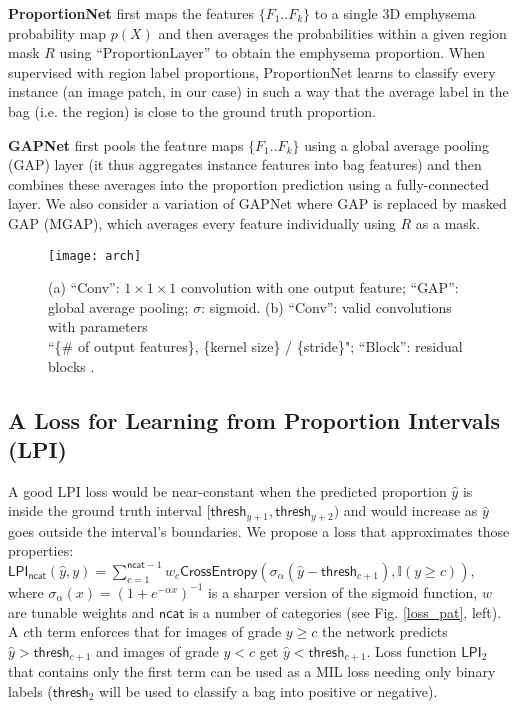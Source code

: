 \documentclass{llncs}
\begin{document}
\textbf{ProportionNet} first maps the features $\{F_1..F_k\}$ to a single 3D emphysema probability map $p(X)$ and then averages the probabilities within a given region mask $R$ using ``ProportionLayer'' to obtain the emphysema proportion.
When supervised with region label proportions, ProportionNet learns to classify every instance (an image patch, in our case) in such a way that the average label in the bag (i.e. the region) is close to the ground truth proportion.

\textbf{GAPNet} first pools the feature maps $\{F_1..F_k\}$ using a global average pooling (GAP) layer (it thus aggregates instance features into bag features) and then combines these averages into the proportion prediction using a fully-connected layer.
We also consider a variation of GAPNet where GAP is replaced by masked GAP (MGAP), which averages every feature individually using $R$ as a mask.

\begin{figure}[!t]
\centering
\texttt{[image: arch]}
\caption{
(a) ``Conv'': $1 \times 1 \times 1$ convolution with one output feature;
``GAP'': global average pooling;
$\sigma$: sigmoid.
(b) ``Conv'': valid convolutions with parameters \\
``\{\# of output features\}, \{kernel size\} / \{stride\}";
``Block'': residual blocks \cite{He2016}.
}
\label{arch}
\end{figure}

\subsection{A Loss for Learning from Proportion Intervals (LPI)}\label{objective}

A good LPI loss would be near-constant when the predicted proportion $\hat{y}$ is inside the ground truth interval $[\textsf{thresh}_{y+1},
\textsf{thresh}_{y+2})$ and would increase as $\hat{y}$ goes outside the interval's boundaries. We propose a loss that approximates those properties:
$
\textsf{LPI}_{\textsf{ncat}}( \hat{y}, y ) =
\sum_{c=1}^{\textsf{ncat} - 1}{
w_c\textsf{CrossEntropy}(\sigma_\alpha(\hat{y} - \textsf{thresh}_{c+1}),
\mathbb{I}(y \geq c))
}
$,
where $\sigma_\alpha(x) = (1 + e^{-\alpha x})^{-1}$ is a sharper version of the sigmoid function, $w$ are tunable weights and $\textsf{ncat}$ is a number of categories (see Fig. \ref{loss_pat}, left). 
A $c$th term enforces that for images of grade $y \geq c$ the network predicts $\hat{y} > \textsf{thresh}_{c+1}$ and images of grade $y < c$ get $\hat{y} < \textsf{thresh}_{c+1}$.
Loss function $\textsf{LPI}_2$ that contains only the first term can be used as a MIL loss needing only binary labels ($\textsf{thresh}_2$ will be used to classify a bag into positive or negative).
\end{document}
